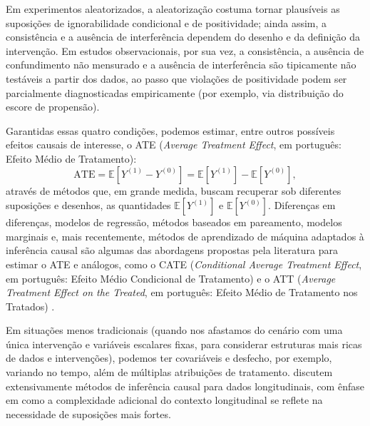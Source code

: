 Em experimentos aleatorizados, a aleatorização costuma tornar plausíveis as suposições de ignorabilidade condicional e de positividade; ainda assim, a consistência e a ausência de interferência dependem do desenho e da definição da intervenção. Em estudos observacionais, por sua vez, a consistência, a ausência de confundimento não mensurado e a ausência de interferência são tipicamente não testáveis a partir dos dados, ao passo que violações de positividade podem ser parcialmente diagnosticadas empiricamente (por exemplo, via distribuição do escore de propensão).

Garantidas essas quatro condições, podemos estimar, entre outros possíveis efeitos causais de interesse, o ATE (\emph{Average Treatment Effect}, em português: Efeito Médio de Tratamento):
\begin{equation}
    \mathrm{ATE} = \mathbb{E}[Y^{(1)} - Y^{(0)}] = \mathbb{E}[Y^{(1)}] - \mathbb{E}[Y^{(0)}],
    \label{eq:ate_def}
\end{equation}
através de métodos que, em grande medida, buscam recuperar sob diferentes suposições e desenhos, as quantidades \(\mathbb{E}[Y^{(1)}]\) e \(\mathbb{E}[Y^{(0)}]\).
Diferenças em diferenças, modelos de regressão, métodos baseados em pareamento, modelos marginais e, mais recentemente, métodos de aprendizado de máquina adaptados à inferência causal são algumas das abordagens propostas pela literatura para estimar o ATE e análogos, como o CATE (\emph{Conditional Average Treatment Effect}, em português: Efeito Médio Condicional de Tratamento) e o ATT (\emph{Average Treatment Effect on the Treated}, em português: Efeito Médio de Tratamento nos Tratados) \cite{rubin_estimating_1974, imbens_causal_2015, hernan_causal_2023, nogueira_methods_2022, yao_survey_2021, chernozhukov_doubledebiased_2018, athey_estimating_2019}. 

Em situações menos tradicionais (quando nos afastamos do cenário com uma única intervenção e variáveis escalares fixas, para considerar estruturas mais ricas de dados e intervenções), podemos ter covariáveis e desfecho, por exemplo, variando no tempo, além de múltiplas atribuições de tratamento. 
 discutem extensivamente métodos de inferência causal para dados longitudinais, com ênfase em como a complexidade adicional do contexto longitudinal se reflete na necessidade de suposições mais fortes. 

